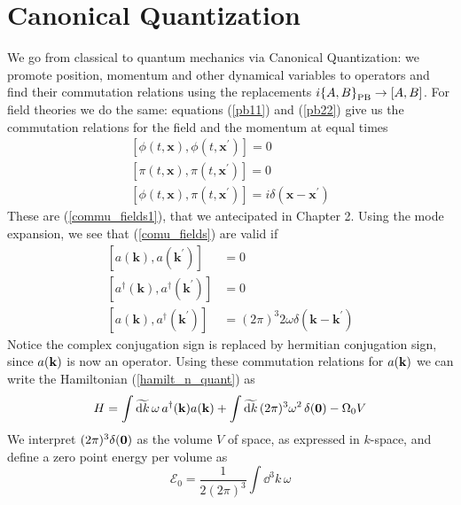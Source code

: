 \section{Canonical Quantization}
We go from classical to quantum mechanics via Canonical Quantization: we promote position, momentum and other dynamical variables to operators and find their commutation relations using the replacements $i\poissonbracket{A}{B}_{\text{PB}}\to\comm{A}{B}$. For field theories we do the same: equations (\ref{pb11}) and (\ref{pb22}) give us the commutation relations for the field and the momentum at equal times
\begin{equation}
\begin{array}{l}
{\left[\phi(t,\mathbf{x}), \phi\left(t,\mathbf{x}^{\prime}\right)\right]=0} \\
{\left[\pi(t,\mathbf{x}), \pi\left(t,\mathbf{x}^{\prime}\right)\right]=0} \\
{\left[\phi(t,\mathbf{x}), \pi\left(t,\mathbf{x}^{\prime}\right)\right]=i \delta(\mathbf{x}-\mathbf{x}^{\prime})}
\end{array}
\label{comu_fields}
\end{equation}
These are (\ref{commu_fields1}), that we antecipated in Chapter 2. Using the mode expansion, we see that (\ref{comu_fields}) are valid if
\begin{equation}
\begin{aligned}
\left[a(\mathbf{k}), a\left(\mathbf{k}^{\prime}\right)\right] &=0 \\
\left[a^{\dagger}(\mathbf{k}), a^{\dagger}\left(\mathbf{k}^{\prime}\right)\right] &=0 \\
\left[a(\mathbf{k}), a^{\dagger}\left(\mathbf{k}^{\prime}\right)\right] &=(2 \pi)^{3} 2 \omega \delta(\mathbf{k}-\mathbf{k}^{\prime})
\label{commu_creators}
\end{aligned}
\end{equation}
Notice the complex conjugation sign is replaced by hermitian conjugation sign, since $a(\vb{k})$ is now an operator. Using these commutation relations for $a(\vb{k})$ we can write the Hamiltonian (\ref{hamilt_n_quant}) as
\begin{equation}
    H=\int\widetilde{\dd k}\, \omega\,  a^{\dagger}(\vb{k})a(\vb{k}) +\int\widetilde{\dd k}\,(2\pi)^3\omega^2\,\delta(\vb{0}) -\Omega_0V
\end{equation}
 We interpret $(2\pi)^3\delta(\vb{0})$ as the volume $V$ of space, as expressed in $k$-space, and define a zero point energy per volume as
\begin{equation}
    \mathcal{E}_0=\frac{1}{2(2\pi)^3}\int\dd^3 k\,\omega
    \label{zeropoint}
\end{equation}
